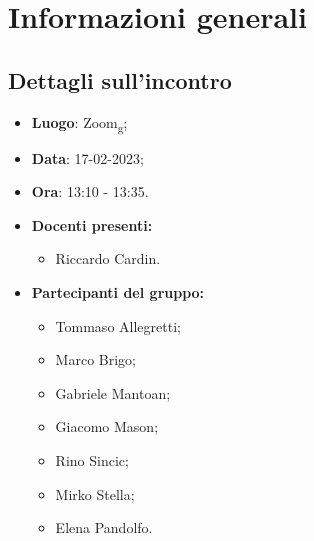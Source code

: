 \section{Informazioni generali}

\subsection{Dettagli sull'incontro}
\begin{itemize}
    \item \textbf{Luogo}: Zoom\textsubscript{g};
    \item \textbf{Data}: 17-02-2023;
    \item \textbf{Ora}: 13:10 - 13:35.
    \item \textbf{Docenti presenti:}
        \begin{itemize}
            \item Riccardo Cardin.
        \end{itemize}
    \item \textbf{Partecipanti del gruppo:}
        \begin{itemize}
            \item Tommaso Allegretti;
            \item Marco Brigo;
            \item Gabriele Mantoan;
            \item Giacomo Mason;
            \item Rino Sincic;
            \item Mirko Stella;
            \item Elena Pandolfo.
        \end{itemize}
\end{itemize}